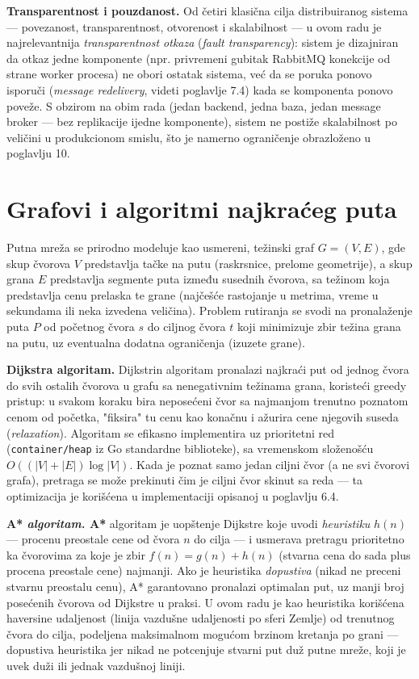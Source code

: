 \textbf{Transparentnost i pouzdanost.} Od četiri klasična cilja distribuiranog sistema — povezanost, transparentnost, otvorenost i skalabilnost \cite{tanenbaum} — u ovom radu je najrelevantnija \emph{transparentnost otkaza} (\emph{fault transparency}): sistem je dizajniran da otkaz jedne komponente (npr. privremeni gubitak RabbitMQ konekcije od strane worker procesa) ne obori ostatak sistema, već da se poruka ponovo isporuči (\emph{message redelivery}, videti poglavlje 7.4) kada se komponenta ponovo poveže. S obzirom na obim rada (jedan backend, jedna baza, jedan message broker — bez replikacije ijedne komponente), sistem ne postiže skalabilnost po veličini u produkcionom smislu, što je namerno ograničenje obrazloženo u poglavlju 10.

\section{Grafovi i algoritmi najkraćeg puta}

Putna mreža se prirodno modeluje kao usmereni, težinski graf $G = (V, E)$, gde skup čvorova $V$ predstavlja tačke na putu (raskrsnice, prelome geometrije), a skup grana $E$ predstavlja segmente puta između susednih čvorova, sa težinom koja predstavlja cenu prelaska te grane (najčešće rastojanje u metrima, vreme u sekundama ili neka izvedena veličina). Problem rutiranja se svodi na pronalaženje puta $P$ od početnog čvora $s$ do ciljnog čvora $t$ koji minimizuje zbir težina grana na putu, uz eventualna dodatna ograničenja (izuzete grane).

\textbf{Dijkstra algoritam.} Dijkstrin algoritam \cite{dijkstra} pronalazi najkraći put od jednog čvora do svih ostalih čvorova u grafu sa nenegativnim težinama grana, koristeći greedy pristup: u svakom koraku bira neposećeni čvor sa najmanjom trenutno poznatom cenom od početka, "fiksira" tu cenu kao konačnu i ažurira cene njegovih suseda (\emph{relaxation}). Algoritam se efikasno implementira uz prioritetni red (\texttt{container/heap} iz Go standardne biblioteke), sa vremenskom složenošću $O((|V| + |E|)\log|V|)$. Kada je poznat samo jedan ciljni čvor (a ne svi čvorovi grafa), pretraga se može prekinuti čim je ciljni čvor skinut sa reda — ta optimizacija je korišćena u implementaciji opisanoj u poglavlju 6.4.

\textbf{A*\emph{ algoritam.} A*} algoritam \cite{astar} je uopštenje Dijkstre koje uvodi \emph{heuristiku} $h(n)$ — procenu preostale cene od čvora $n$ do cilja — i usmerava pretragu prioritetno ka čvorovima za koje je zbir $f(n) = g(n) + h(n)$ (stvarna cena do sada plus procena preostale cene) najmanji. Ako je heuristika \emph{dopustiva} (nikad ne preceni stvarnu preostalu cenu), A* garantovano pronalazi optimalan put, uz manji broj posećenih čvorova od Dijkstre u praksi. U ovom radu je kao heuristika korišćena haversine udaljenost (linija vazdušne udaljenosti po sferi Zemlje) od trenutnog čvora do cilja, podeljena maksimalnom mogućom brzinom kretanja po grani — dopustiva heuristika jer nikad ne potcenjuje stvarni put duž putne mreže, koji je uvek duži ili jednak vazdušnoj liniji.


